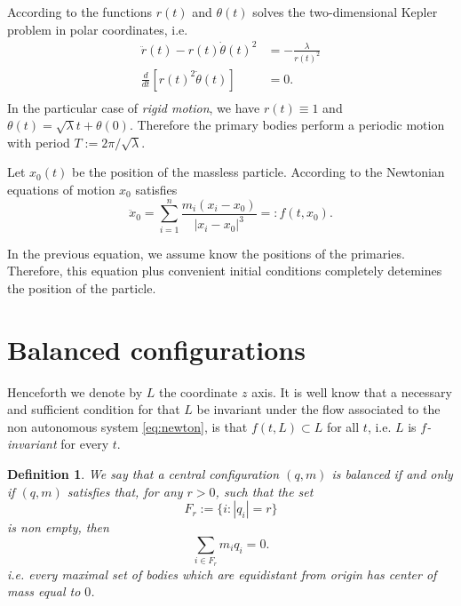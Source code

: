 \documentclass[twoside]{article}
\newtheorem{defi}[thm]{Definition}
\theoremstyle{remark}
\begin{document}
According to \cite[Eq. (2.16)]{JaumeLlibre276}  the functions $r(t)$ and $\theta (t)$ solves the two-dimensional Kepler problem in polar coordinates, i.e.
\begin{equation}
 \begin{array}{rl}\label{eq:kepler.2.dim}
\ddot{r}(t)-r(t)\dot{\theta}(t)^2 & = -\frac{\lambda}{r(t)^2}\\
\frac{d }{dt}\left[ r(t)^2\dot{\theta}(t)\right] & =0.\\
\end{array}
\end{equation}
In the particular case of \emph{rigid motion}, we have  $r(t)\equiv 1$ and $\theta (t)=\sqrt{\lambda }t +\theta(0)$. Therefore the primary bodies perform a periodic motion with period $T:=2\pi/\sqrt{\lambda }$.

Let $x_0(t)$ be the position of the massless particle.
According to the Newtonian equations of motion $x_0$ satisfies
\begin{equation}\label{eq:newton}
 \ddot{x}_0=\sum_{i=1}^n\frac{m_i(x_i-x_0)}{|x_i-x_0|^3}=:f(t,x_0).
\end{equation}

In the previous equation, we assume know the positions of the primaries. Therefore, this equation plus convenient initial conditions completely detemines the position of the particle.



\section{Balanced configurations}\label{sec:admisible.configuraciones}
Henceforth we denote by $L$ the coordinate $z$ axis.
It is well know that a  necessary and sufficient condition for that $L$ be invariant under the  flow associated to the non autonomous system  \eqref{eq:newton}, is that $f(t,L)\subset L$ for all $t$, i.e. $L$ is \emph{$f$-invariant} for every $t$.


\begin{defi}
We say that a
central configuration $(q,m)$ is \emph{balanced} if and only if $(q,m)$ satisfies that, for any $r>0$, such that the set
\[F_r:=\{i:|q_i|=r\}\]
is non empty, then
\begin{equation}\label{eq:suma0}\sum_{i\in F_r}m_iq_i=0.\end{equation}
i.e. every maximal set of  bodies which are equidistant from origin has center of mass equal to $0$.
\end{defi}
\end{document}
